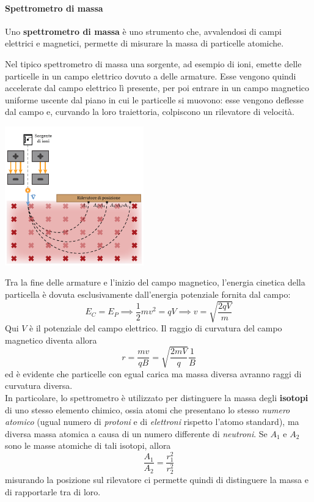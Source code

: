 \paragraph{Spettrometro di massa}
\begin{define}
	Uno \textbf{spettrometro di massa} è uno strumento che, avvalendosi di campi elettrici e magnetici, permette di misurare la massa di particelle atomiche.
\end{define}
Nel tipico spettrometro di massa una sorgente, ad esempio di ioni, emette delle particelle in un campo elettrico dovuto a delle armature. Esse vengono quindi accelerate dal campo elettrico lì presente, per poi entrare in un campo magnetico uniforme uscente dal piano in cui le particelle si muovono: esse vengono deflesse dal campo e, curvando la loro traiettoria, colpiscono un rilevatore di velocità.
	\begin{center}
	\includegraphics[width=0.45\textwidth]{images/chp7/chp7spettrometro.pdf}
\end{center}
Tra la fine delle armature e l'inizio del campo magnetico, l'energia cinetica della particella è dovuta esclusivamente dall'energia potenziale fornita dal campo:
\begin{equation*}
	E_C=E_P\implies \frac{1}{2}mv^2=qV\implies v=\sqrt{\frac{2qV}{m}}
\end{equation*}
Qui $V$ è il potenziale del campo elettrico. Il raggio di curvatura del campo magnetico diventa allora
\begin{equation*}
	r=\frac{mv}{qB}=\sqrt{\frac{2mV}{q}}\frac{1}{B}
\end{equation*}
ed è evidente che particelle con egual carica ma massa diversa avranno raggi di curvatura diversa.\\
In particolare, lo spettrometro è utilizzato per distinguere la massa degli \textbf{isotopi} di uno stesso elemento chimico, ossia atomi che presentano lo stesso \textit{numero atomico} (ugual numero di \textit{protoni} e di \textit{elettroni} rispetto l'atomo standard), ma diversa massa atomica a causa di un numero differente di \textit{neutroni}.
Se $A_1$ e $A_2$ sono le masse atomiche di tali isotopi, allora
\begin{equation*}
	\frac{A_1}{A_2}=\frac{r_1^2}{r_2^2}
\end{equation*}
misurando la posizione sul rilevatore ci permette quindi di distinguere la massa e di rapportarle tra di loro.
